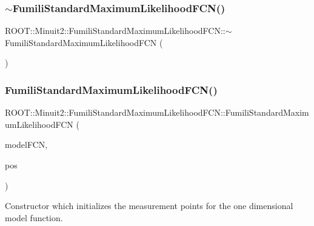 \subsubsection{\texorpdfstring{$\sim$FumiliStandardMaximumLikelihoodFCN()}{~FumiliStandardMaximumLikelihoodFCN()}\hspace{0.1cm}{\footnotesize\ttfamily [1/2]}}
{\footnotesize\ttfamily R\+O\+O\+T\+::\+Minuit2\+::\+Fumili\+Standard\+Maximum\+Likelihood\+F\+C\+N\+::$\sim$\+Fumili\+Standard\+Maximum\+Likelihood\+F\+CN (\begin{DoxyParamCaption}{ }\end{DoxyParamCaption})\hspace{0.3cm}{\ttfamily [inline]}}

\mbox{\label{classROOT_1_1Minuit2_1_1FumiliStandardMaximumLikelihoodFCN_af7dc80571b509a0a4f2f7ef821c3b1e6}} 
\subsubsection{\texorpdfstring{FumiliStandardMaximumLikelihoodFCN()}{FumiliStandardMaximumLikelihoodFCN()}\hspace{0.1cm}{\footnotesize\ttfamily [3/4]}}
{\footnotesize\ttfamily R\+O\+O\+T\+::\+Minuit2\+::\+Fumili\+Standard\+Maximum\+Likelihood\+F\+C\+N\+::\+Fumili\+Standard\+Maximum\+Likelihood\+F\+CN (\begin{DoxyParamCaption}\item[{const \mbox{\hyperlink{classROOT_1_1Minuit2_1_1ParametricFunction}{Parametric\+Function}} \&}]{model\+F\+CN,  }\item[{const std\+::vector$<$ double $>$ \&}]{pos }\end{DoxyParamCaption})\hspace{0.3cm}{\ttfamily [inline]}}

Constructor which initializes the measurement points for the one dimensional model function.



